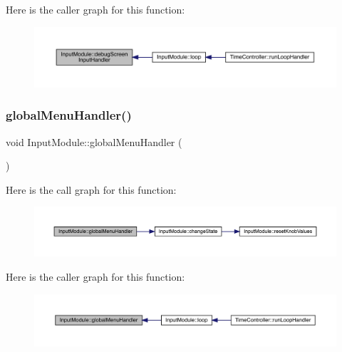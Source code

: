 Here is the caller graph for this function\+:
\nopagebreak
\begin{figure}[H]
\begin{center}
\leavevmode
\includegraphics[width=350pt]{class_input_module_a341016de304d4ac105a9f5c98a76a853_icgraph}
\end{center}
\end{figure}
\mbox{\label{class_input_module_a9844fa2022c8e526c431cd084556ffe0}} 
\subsubsection{\texorpdfstring{global\+Menu\+Handler()}{globalMenuHandler()}}
{\footnotesize\ttfamily void Input\+Module\+::global\+Menu\+Handler (\begin{DoxyParamCaption}{ }\end{DoxyParamCaption})}

Here is the call graph for this function\+:
\nopagebreak
\begin{figure}[H]
\begin{center}
\leavevmode
\includegraphics[width=350pt]{class_input_module_a9844fa2022c8e526c431cd084556ffe0_cgraph}
\end{center}
\end{figure}
Here is the caller graph for this function\+:
\nopagebreak
\begin{figure}[H]
\begin{center}
\leavevmode
\includegraphics[width=350pt]{class_input_module_a9844fa2022c8e526c431cd084556ffe0_icgraph}
\end{center}
\end{figure}
\mbox{\label{class_input_module_a789c6f0da21e6b5b89c7c6991f4ee745}} 
